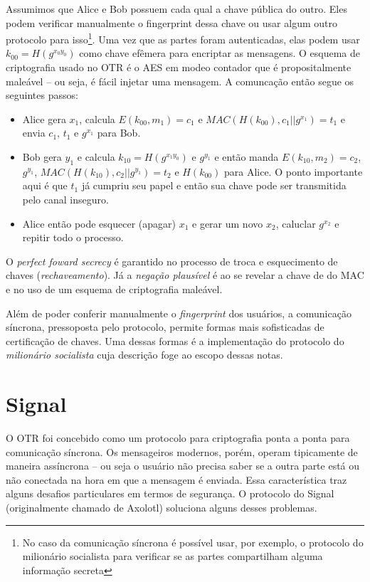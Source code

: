 Assumimos que Alice e Bob possuem cada qual a chave pública do outro.
Eles podem verificar manualmente o fingerprint dessa chave ou usar algum outro protocolo para isso\footnote{No caso da comunicação síncrona é possível usar, por exemplo, o protocolo do milionário socialista para verificar se as partes compartilham alguma informação secreta}.
Uma vez que as partes foram autenticadas, elas podem usar $k_{00} = H(g^{x_0y_0})$ como chave efêmera para encriptar as mensagens.
O esquema de criptografia usado no OTR é o AES em modeo contador que é propositalmente maleável -- ou seja, é fácil injetar uma mensagem.
A comuncação então segue os seguintes passos:
\begin{itemize}
\item Alice gera $x_1$, calcula $E(k_{00}, m_1) = c_1$ e $MAC(H(k_{00}), c_1 || g^{x_1}) = t_1 $ e envia $c_1$, $t_1$ e $g^{x_1}$ para Bob.
\item Bob gera $y_1$ e calcula $k_{10} = H(g^{x_1y_0})$ e $g^{y_1}$ e então manda $E(k_{10}, m_2) = c_2$, $g^{y_1}$, $MAC(H(k_{10}), c_2 || g^{y_1}) = t_2$ e $H(k_{00})$ para Alice.
O ponto importante aqui é que $t_1$ já cumpriu seu papel e então sua chave pode ser transmitida pelo canal inseguro. 
\item Alice então pode esquecer (apagar) $x_1$ e gerar um novo $x_2$, caluclar $g^{x_2}$ e repitir todo o processo.
\end{itemize}

O {\em perfect foward secrecy} é garantido no processo de troca e esquecimento de chaves ({\em rechaveamento}).
Já a {\em negação plausível} é ao se revelar a chave de do MAC e no uso de um esquema de criptografia maleável.

Além de poder conferir manualmente o {\em fingerprint} dos usuários, a comunicação síncrona, pressoposta pelo protocolo, permite formas mais sofisticadas de certificação de chaves.
Uma dessas formas é a implementação do protocolo do {\em milionário socialista} cuja descrição foge ao escopo dessas notas.

\section{Signal}
\label{sec:signal}

O OTR foi concebido como um protocolo para criptografia ponta a ponta para comunicação síncrona.
Os mensageiros modernos, porém, operam tipicamente de maneira assíncrona -- ou seja o usuário não precisa saber se a outra parte está ou não conectada na hora em que a mensagem é enviada.
Essa característica traz alguns desafios particulares em termos de segurança.
O protocolo do Signal (originalmente chamado de Axolotl) soluciona alguns desses problemas.

